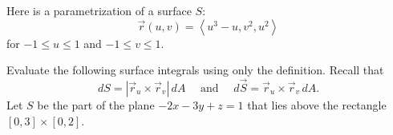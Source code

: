 \documentclass[addpoints, 12pt]{exam}%
\theoremstyle{definition}
\begin{document}
\begin{questions}

\newpage

\question
Here is a parametrization of a surface $S$:
  \[
    \vec{r} (u, v) = \left\langle u^3-u, v^2,u^2 \right\rangle 
  \]
for $-1 \leq u \leq 1$ and $-1 \leq v \leq 1$.

\newpage

\phantom{2} 

\newpage

\question 
Evaluate the following surface integrals using only the definition. Recall that
  \[
    dS = |\vec{r}_u \times \vec{r}_v| \, dA \quad \text{ and } \quad d\vec{S} = \vec{r}_u \times \vec{r}_v \, dA .
  \]
Let $S$ be the part of the plane $-2x - 3y + z = 1$ that lies above the rectangle $[0, 3] \times [0, 2]$.


\newpage 

\phantom{2} 


\end{questions}
\end{document}
